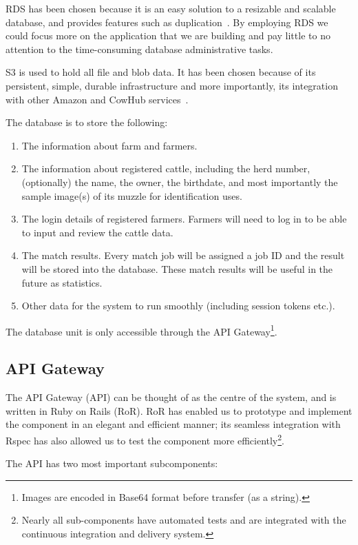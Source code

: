 RDS has been chosen because it is an easy solution to a resizable and scalable database, and provides features such as duplication~\cite{rds}. By employing RDS we could focus more on the application that we are building and pay little to no attention to the time-consuming database administrative tasks.

S3 is used to hold all file and blob data. It has been chosen because of its persistent, simple, durable infrastructure and more importantly, its integration with other Amazon and CowHub services~\cite{s3}.

The database is to store the following:

\begin{enumerate}
	\item The information about farm and farmers. 
	\item The information about registered cattle, including the herd number, (optionally) the name, the owner, the birthdate, and most importantly the sample image(s) of its muzzle for identification uses.
	\item The login details of registered farmers. Farmers will need to log in to be able to input and review the cattle data.
	\item The match results. Every match job will be assigned a job ID and the result will be stored into the database. These match results will be useful in the future as statistics.
	\item Other data for the system to run smoothly (including session tokens etc.). 
\end{enumerate}

The database unit is only accessible through the API Gateway\footnote{Images are encoded in Base64 format before transfer (as a string).}.

\subsection{API Gateway}
The API Gateway (API) can be thought of as the centre of the system, and is written in Ruby on Rails (RoR). RoR has enabled us to prototype and implement the component in an elegant and efficient manner; its seamless integration with Rspec has also allowed us to test the component more efficiently\footnote{Nearly all sub-components have automated tests and are integrated with the continuous integration and delivery system.}.

The API has two most important subcomponents:

